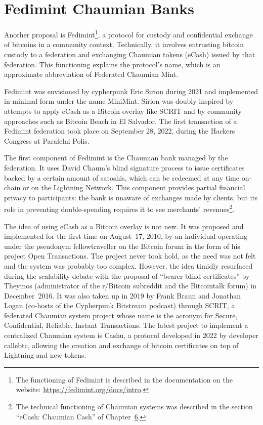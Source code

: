\documentclass[
  a5paper,
  smalldemyvopaper,10pt,twoside,onecolumn,openright,extrafontsizes,hidelinks]{memoir}
\begin{document}
\section*{Fedimint Chaumian Banks}\label{fedimint-chaumian-banks}


Another proposal is Fedimint\footnote{The functioning of Fedimint is
  described in the documentation on the website:
  \url{https://fedimint.org/docs/intro}.}, a protocol for custody and
confidential exchange of bitcoins in a community context. Technically,
it involves entrusting bitcoin custody to a federation and exchanging
Chaumian tokens (eCash) issued by that federation. This functioning
explains the protocol's name, which is an approximate abbreviation of
Federated Chaumian Mint.

Fedimint was envisioned by cypherpunk Eric Sirion during 2021 and
implemented in minimal form under the name MiniMint. Sirion was doubly
inspired by attempts to apply eCash as a Bitcoin overlay like SCRIT and
by community approaches such as Bitcoin Beach in El Salvador. The first
transaction of a Fedimint federation took place on September 28, 2022,
during the Hackers Congress at Paralelni Polis.

The first component of Fedimint is the Chaumian bank managed by the
federation. It uses David Chaum's blind signature process to issue
certificates backed by a certain amount of satoshis, which can be
redeemed at any time on-chain or on the Lightning Network. This
component provides partial financial privacy to participants: the bank
is unaware of exchanges made by clients, but its role in preventing
double-spending requires it to see merchants' revenues\footnote{The
  technical functioning of Chaumian systems was described in the section
  ``eCash: Chaumian Cash'' of Chapter~\hyperref[ch:cybermonnaie]{6}.}.

The idea of using eCash as a Bitcoin overlay is not new. It was proposed
and implemented for the first time on August~17, 2010, by an individual
operating under the pseudonym fellowtraveller on the Bitcoin forum in
the form of his project Open Transactions. The project never took hold,
as the need was not felt and the system was probably too complex.
However, the idea timidly resurfaced during the scalability debate with
the proposal of ``bearer blind certificates'' by Theymos (administrator
of the r/Bitcoin subreddit and the Bitcointalk forum) in December~2016.
It was also taken up in 2019 by Frank Braun and Jonathan Logan (co-hosts
of the Cypherpunk Bitstream podcast) through SCRIT, a federated Chaumian
system project whose name is the acronym for Secure, Confidential,
Reliable, Instant Transactions. The latest project to implement a
centralized Chaumian system is Cashu, a protocol developed in 2022 by
developer callebtc, allowing the creation and exchange of bitcoin
certificates on top of Lightning and new tokens.
\end{document}
